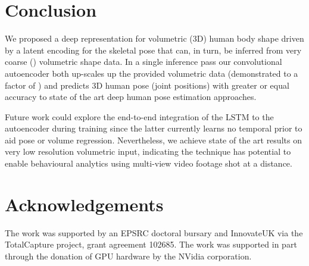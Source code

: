 \documentclass[runningheads]{llncs}
\begin{document}
\section{Conclusion}

We proposed a deep representation for volumetric (3D) human body shape driven by a latent encoding for the skeletal pose that can, in turn, be inferred from very coarse () volumetric shape data.  In a single inference pass our convolutional autoencoder both up-scales up the provided volumetric data (demonstrated to a factor of ) and predicts 3D human pose (joint positions) with greater or equal accuracy to state of the art deep human pose estimation approaches.  

Future work could explore the end-to-end integration of the LSTM to the autoencoder during training since the latter currently learns no temporal prior to aid pose or volume regression.  Nevertheless, we achieve state of the art results on very low resolution volumetric input, indicating the technique has potential to enable behavioural analytics using multi-view video footage shot at a distance.

\section*{Acknowledgements}
The work was supported by an EPSRC doctoral bursary and InnovateUK via the TotalCapture project, grant agreement 102685.   The work was supported in part through the donation of GPU hardware by the NVidia corporation.



\end{document}
